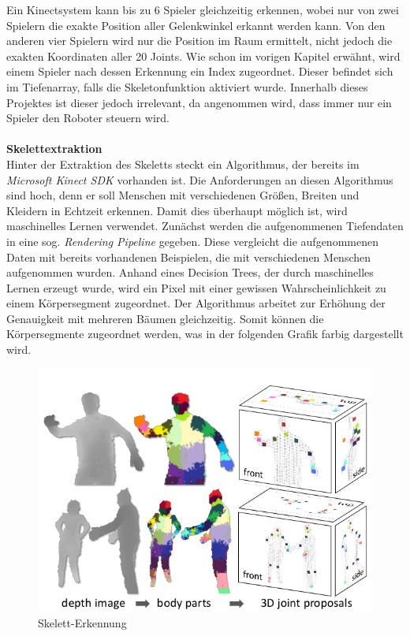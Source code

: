 Ein Kinectsystem kann bis zu 6 Spieler gleichzeitig erkennen, wobei nur von zwei Spielern die exakte Position aller Gelenkwinkel erkannt werden kann. Von den anderen vier Spielern wird nur die Position im Raum ermittelt, nicht jedoch die exakten Koordinaten aller 20 Joints. Wie schon im vorigen Kapitel erwähnt, wird einem Spieler nach dessen Erkennung ein Index zugeordnet. Dieser befindet sich im Tiefenarray, falls die Skeletonfunktion aktiviert wurde. Innerhalb dieses Projektes ist dieser jedoch irrelevant, da angenommen wird, dass immer nur ein Spieler
den Roboter steuern wird.\\ \\

\textbf{Skelettextraktion}\\
Hinter der Extraktion des Skeletts steckt ein Algorithmus, der bereits im \textit{Microsoft Kinect SDK} vorhanden ist. 
Die Anforderungen an diesen Algorithmus sind hoch, denn er soll Menschen mit verschiedenen Größen,
Breiten und Kleidern in Echtzeit erkennen.
Damit dies überhaupt möglich ist, wird maschinelles Lernen verwendet. Zunächst werden die aufgenommenen Tiefendaten in eine sog. \textit{Rendering Pipeline}\cite{pdf:realtime_human_pose} gegeben. Diese vergleicht die aufgenommenen Daten mit bereits
vorhandenen Beispielen, die mit verschiedenen Menschen aufgenommen wurden. Anhand eines Decision Trees, der durch maschinelles Lernen erzeugt wurde, wird ein Pixel mit einer gewissen Wahrscheinlichkeit zu einem Körpersegment zugeordnet. Der Algorithmus arbeitet zur Erhöhung der Genauigkeit mit mehreren Bäumen gleichzeitig. Somit können die Körpersegmente zugeordnet werden, was in der folgenden Grafik farbig dargestellt wird.

\begin{figure}[H]						
	\centering							
	\includegraphics[scale=0.5]{Bilder/kinect_body_parts.png}			
	\caption{Skelett-Erkennung \cite{pdf:realtime_human_pose}}						
	\label{f:kinect_skeleton}						
\end{figure}

